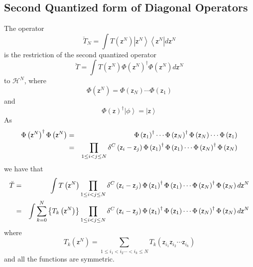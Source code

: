 \documentclass[aps,preprint]{revtex4}
\begin{document}
\subsection{Second Quantized form of Diagonal Operators}

The operator 
\begin{equation}
\breve{T}_{N}=\int T\left( \mathsf{z}^{N}\right) \left\vert \mathsf{z}%
^{N}\right\rangle \left\langle \mathsf{z}^{N}\right\vert d\mathsf{z}^{N}
\end{equation}%
is the restriction of the second quantized operator%
\begin{equation}
\breve{T}=\int T\left( \mathsf{z}^{N}\right) \Phi \left( \mathsf{z}%
^{N}\right) ^{\dagger }\Phi \left( \mathsf{z}^{N}\right) d\mathsf{z}^{N}
\end{equation}%
to $\mathcal{H}^{N}$, where 
\begin{equation}
\Phi \left( \mathsf{z}^{N}\right) =\Phi \left( \mathsf{z}_{N}\right) \cdots
\Phi \left( \mathsf{z}_{1}\right)
\end{equation}%
and 
\begin{equation}
\Phi \left( \mathsf{z}\right) ^{\dagger }\left\vert \phi \right\rangle
=\left\vert \mathsf{z}\right\rangle
\end{equation}%
As%
\begin{eqnarray}
\Phi \left( \mathsf{z}^{N}\right) ^{\dagger }\Phi \left( \mathsf{z}%
^{N}\right) &=&\Phi \left( \mathsf{z}_{1}\right) ^{\dagger }\cdots \Phi
\left( \mathsf{z}_{N}\right) ^{\dagger }\Phi \left( \mathsf{z}_{N}\right)
\cdots \Phi \left( \mathsf{z}_{1}\right)  \notag \\
&=&\prod_{1\leq i<j\leq N}\delta ^{C}\left( \mathsf{z}_{i}-\mathsf{z}%
_{j}\right) \Phi \left( \mathsf{z}_{1}\right) ^{\dagger }\Phi \left( \mathsf{%
z}_{1}\right) \cdots \Phi \left( \mathsf{z}_{N}\right) ^{\dagger }\Phi
\left( \mathsf{z}_{N}\right)
\end{eqnarray}%
we have that%
\begin{eqnarray}
\breve{T} &=&\int T\left( \mathsf{z}^{N}\right) \prod_{1\leq i<j\leq
N}\delta ^{C}\left( \mathsf{z}_{i}-\mathsf{z}_{j}\right) \Phi \left( \mathsf{%
z}_{1}\right) ^{\dagger }\Phi \left( \mathsf{z}_{1}\right) \cdots \Phi
\left( \mathsf{z}_{N}\right) ^{\dagger }\Phi \left( \mathsf{z}_{N}\right) d%
\mathsf{z}^{N}  \notag \\
&=&\int \sum_{k=0}^{N}\left\{ T_{k}\left( \mathsf{z}^{N}\right) \right\}
\prod_{1\leq i<j\leq N}\delta ^{C}\left( \mathsf{z}_{i}-\mathsf{z}%
_{j}\right) \Phi \left( \mathsf{z}_{1}\right) ^{\dagger }\Phi \left( \mathsf{%
z}_{1}\right) \cdots \Phi \left( \mathsf{z}_{N}\right) ^{\dagger }\Phi
\left( \mathsf{z}_{N}\right) d\mathsf{z}^{N}
\end{eqnarray}%
where 
\begin{equation}
T_{k}\left( \mathsf{z}^{N}\right) =\sum_{1\leq i_{1}<i_{2}\cdots <i_{k}\leq
N}T_{k}\left( \mathsf{z}_{i_{1}}\mathsf{z}_{i_{2}}\cdots \mathsf{z}%
_{i_{k}}\right)
\end{equation}%
and all the functions are symmetric.
\end{document}
